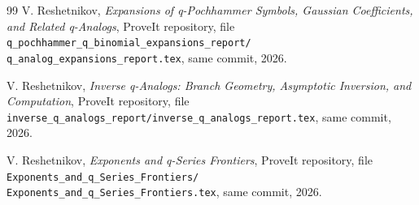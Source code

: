 \documentclass[11pt,letterpaper,oneside,openany]{book}
\theoremstyle{definition}
\theoremstyle{remark}
\begin{document}
\begin{thebibliography}{99}
V. Reshetnikov,
\emph{Expansions of q-Pochhammer Symbols, Gaussian Coefficients, and Related
q-Analogs},
ProveIt repository, file
\texttt{q\_pochhammer\_q\_binomial\_expansions\_report/
q\_analog\_expansions\_report.tex}, same commit, 2026.

V. Reshetnikov,
\emph{Inverse q-Analogs: Branch Geometry, Asymptotic Inversion, and
Computation},
ProveIt repository, file
\texttt{inverse\_q\_analogs\_report/inverse\_q\_analogs\_report.tex},
same commit, 2026.

V. Reshetnikov,
\emph{Exponents and q-Series Frontiers},
ProveIt repository, file
\texttt{Exponents\_and\_q\_Series\_Frontiers/
Exponents\_and\_q\_Series\_Frontiers.tex}, same commit, 2026.

\end{thebibliography}
\end{document}
